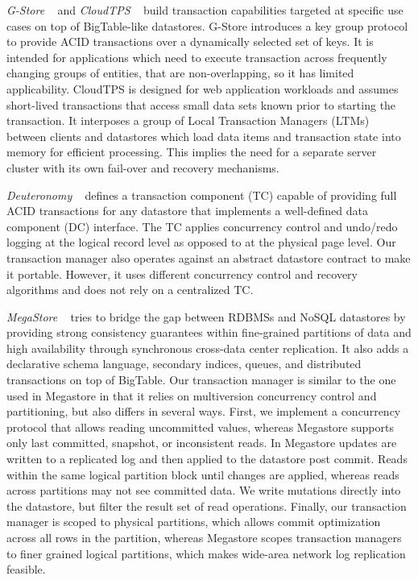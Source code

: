 \documentclass[10pt,final,journal]{IEEEtran}
\begin{document}
\emph{G-Store} ~\cite{Das:2010:GSD:1807128.1807157} and \emph{CloudTPS} ~\cite{Wei:2011:5740834} build transaction capabilities targeted at specific use cases on top of BigTable-like datastores. G-Store introduces a key group protocol to provide ACID transactions over a dynamically selected set of keys. It is intended for applications which need to execute transaction across frequently changing groups of entities, that are non-overlapping, so it has limited applicability. CloudTPS is designed for web application workloads and assumes short-lived transactions that access small data sets known prior to starting the transaction. It interposes a group of Local Transaction Managers (LTMs) between clients and datastores which load data items and transaction state into memory for efficient processing. This implies the need for a separate server cluster with its own fail-over and recovery mechanisms.

\emph{Deuteronomy} ~\cite{Levandoski:2011:8530161} defines a transaction component (TC) capable of providing full ACID transactions for any datastore that implements a well-defined data component (DC) interface. The TC applies concurrency control and undo/redo logging at the logical record level as opposed to at the physical page level. Our transaction manager also operates against an abstract datastore contract to make it portable. However, it uses different concurrency control and recovery algorithms and does not rely on a centralized TC.

\emph{MegaStore} ~\cite{Furman:2008:8530095, Baker:2011:8530095} tries to bridge the gap between RDBMSs and NoSQL datastores by providing strong consistency guarantees within fine-grained partitions of data and high availability through synchronous cross-data center replication. It also adds a declarative schema language, secondary indices, queues, and distributed transactions on top of BigTable. Our transaction manager is similar to the one used in Megastore in that it relies on multiversion concurrency control and partitioning, but also differs in several ways. First, we implement a concurrency protocol that allows reading uncommitted values, whereas Megastore supports only last committed, snapshot, or inconsistent reads. In Megastore updates are written to a replicated log and then applied to the datastore post commit. Reads within the same logical partition block until changes are applied, whereas reads across partitions may not see committed data. We write mutations directly into the datastore, but filter the result set of read operations. Finally, our transaction manager is scoped to physical partitions, which allows commit optimization across all rows in the partition, whereas Megastore scopes transaction managers to finer grained logical partitions, which makes wide-area network log replication feasible.
\end{document}
